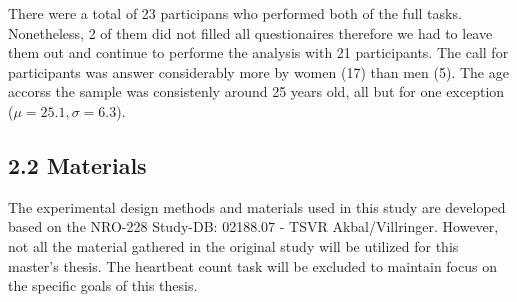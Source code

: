 \documentclass[12pt,oneside,openright]{report}
\begin{document}
There were a total of 23 participans who performed both of the full tasks. Nonetheless, 2 of them did not filled all questionaires therefore we had to leave them out and continue to performe the analysis with 21 participants. The call for participants was answer considerably more by women (17) than men (5). The age accorss the sample was consistenly around 25 years old, all but for one exception ($\mu=25.1 , \sigma=6.3$).

\subsection*{2.2 Materials}
The experimental design methods and materials used in this study are developed based on the NRO-228 Study-DB: 02188.07 - TSVR Akbal/Villringer. However, not all the material gathered in the original study will be utilized for this master's thesis. The heartbeat count task will be excluded to maintain focus on the specific goals of this thesis.
\end{document}
